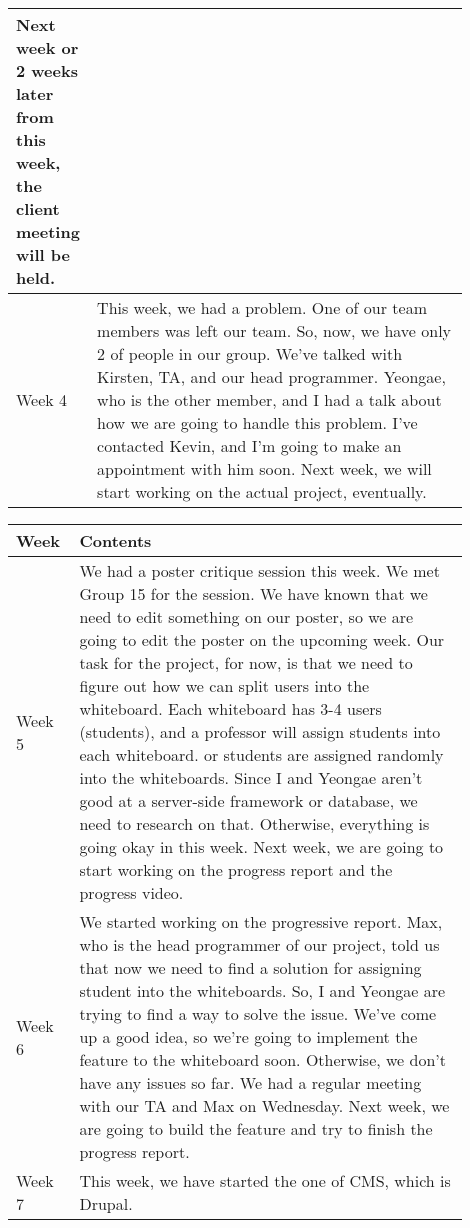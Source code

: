 \documentclass[10pt]{article}
\begin{document}
\begin{center}
\begin{tabular}{ | p{0.1\linewidth} | p{0.8\linewidth} | }
            Next week or 2 weeks later from this week, the client meeting will be held.  \\ \hline
            Week 4 &  This week, we had a problem.
            One of our team members was left our team. So, now, we have only 2 of people in our group.
            We've talked with Kirsten, TA, and our head programmer.
            Yeongae, who is the other member, and I had a talk about how we are going to handle this problem.
            I've contacted Kevin, and I'm going to make an appointment with him soon.
            Next week, we will start working on the actual project, eventually.  \\ \hline 
        \end{tabular}   
    
        \begin{tabular}{ | p{0.1\linewidth} | p{0.8\linewidth} | } \hline
            Week & Contents  \\ \hline                    
            Week 5 &We had a poster critique session this week. We met Group 15 for the session.
            We have known that we need to edit something on our poster, so we are going to edit the poster on
            the upcoming week.
            Our task for the project, for now, is that we need to figure out how we can split users into the whiteboard.
            Each whiteboard has 3-4 users (students), and a professor will assign students into each whiteboard.
            or students are assigned randomly into the whiteboards.
            Since I and Yeongae aren't good at a server-side framework or database, we need to research on that.
            Otherwise, everything is going okay in this week.
            Next week, we are going to start working on the progress report and the progress video.\\ \hline 
            Week 6 & We started working on the progressive report.
            Max, who is the head programmer of our project, told us that now we need to find a solution for assigning student into the whiteboards.
            So, I and Yeongae are trying to find a way to solve the issue.
            We've come up a good idea, so we're going to implement the feature to the whiteboard soon.
            Otherwise, we don't have any issues so far.
            We had a regular meeting with our TA and Max on Wednesday.
            Next week, we are going to build the feature and try to finish the progress report.   \\ \hline 
            Week 7 &  This week, we have started the one of CMS, which is Drupal.

\end{tabular}
\end{center}
\end{document}
